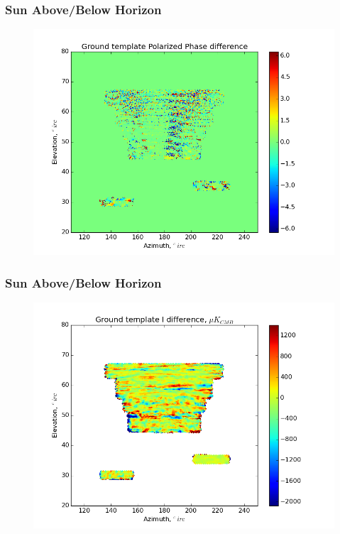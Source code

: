 \documentclass{beamer}
\begin{document}
\begin{frame}
\frametitle{Sun Above/Below Horizon}
\begin{figure}
\includegraphics[width=0.9\linewidth]{dArg_gt_SUN_HORIZON.png}
\end{figure}
\end{frame}

\begin{frame}
\frametitle{Sun Above/Below Horizon}
\begin{figure}
\includegraphics[width=0.9\linewidth]{dI_gt_SUN_HORIZON.png}
\end{figure}
\end{frame}
\end{document}
